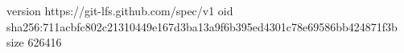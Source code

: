 version https://git-lfs.github.com/spec/v1
oid sha256:711acbfc802c21310449e167d3ba13a9f6b395ed4301c78e69586bb424871f3b
size 626416

